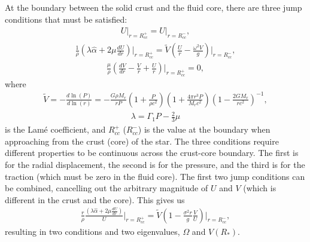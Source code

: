 \documentclass[fleqn,usenatbib]{mnras}
\begin{document}


\hspace{\parindent}At the boundary between the solid crust and the fluid core, there are three jump conditions that must be satisfied:
\begin{align}
U\rvert_{r=R_{cc}^{+}}=U\rvert_{r=R_{cc}^{-}},
\label{eq:jump1}
\end{align}
\begin{align}
\frac{1}{\rho}\left(\lambda\hat{\alpha}+2\mu\frac{dU}{dr}\right)\biggr\rvert_{r=R_{cc}^{+}}=\tilde{V}\left(\frac{U}{r}-\frac{\omega^2V}{g}\right)\biggr\rvert_{r=R_{cc}^{-}},
\label{eq:jump2}
\end{align}
\begin{align}
\frac{\mu}{\rho}\left(\frac{dV}{dr}-\frac{V}{r}+\frac{U}{r}\right)\biggr\rvert_{r=R_{cc}^{+}}=0,
\label{eq:jump3}
\end{align}
\noindent where 
\begin{align}
\tilde{V}=-\frac{d\ln\left(P\right)}{d\ln\left(r\right)}=-\frac{G\rho M_r}{rP}\left(1+\frac{P}{\rho c^2}\right)\left(1+\frac{4\pi r^3 P}{M_r c^2}\right)\left(1-\frac{2GM_r}{rc^2}\right)^{-1},
\end{align}
\begin{align}
\lambda=\Gamma_1P-\frac{2}{3}\mu
\end{align}
\noindent is the Lam\'e coefficient, and $R_{cc}^{+}$ ($R_{cc}^{-}$) is the value at the boundary when approaching from the crust (core) of the star. The three conditions require different properties to be continuous across the crust-core boundary. The first is for the radial displacement, the second is for the pressure, and the third is for the traction (which must be zero in the fluid core). The first two jump conditions can be combined, cancelling out the arbitrary magnitude of $U$ and $V$ (which is different in the crust and the core). This gives us
\begin{align}
\frac{r}{\rho}\frac{\left(\lambda\hat{\alpha}+2\mu\frac{dU}{dr}\right)}{U}\biggr\rvert_{r=R_{cc}^{+}}=\tilde{V}\left(1-\frac{\sigma^2r}{g}\frac{V}{U}\right)\biggr\rvert_{r=R_{cc}^{-}},
\end{align}
\noindent resulting in two conditions and two eigenvalues, $\Omega$ and $V(R_*)$.
\end{document}
